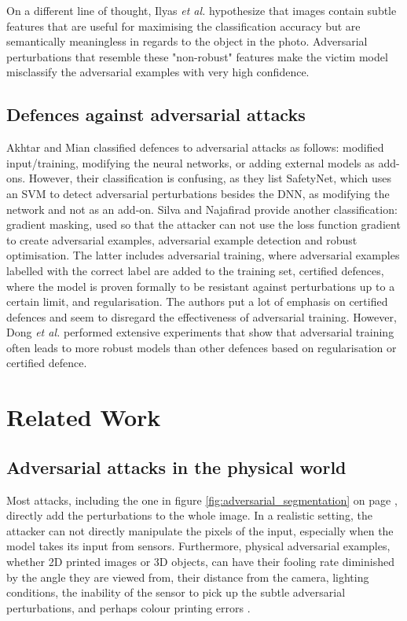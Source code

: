On a different line of thought, Ilyas \textit{et al.} \cite{adv_examples_bugs} hypothesize that images contain subtle features that are useful for maximising the classification accuracy but are semantically meaningless in regards to the object in the photo. Adversarial perturbations that resemble these "non-robust" features make the victim model misclassify the adversarial examples with very high confidence.

\subsection{Defences against adversarial attacks}

Akhtar and Mian \cite{akhtar} classified defences to adversarial attacks as follows: modified input/training, modifying the neural networks, or adding external models as add-ons. However, their classification is confusing, as they list SafetyNet, which uses an SVM to detect adversarial perturbations besides the DNN, as modifying the network and not as an add-on. Silva and Najafirad \cite{silva_survey} provide another classification: gradient masking, used so that the attacker can not use the loss function gradient to create adversarial examples, adversarial example detection and robust optimisation. The latter includes adversarial training, where adversarial examples labelled with the correct label are added to the training set, certified defences, where the model is proven formally to be resistant against perturbations up to a certain limit, and regularisation. The authors put a lot of emphasis on certified defences and seem to disregard the effectiveness of adversarial training. However, Dong \textit{et al.} \cite{dong2020benchmarking} performed extensive experiments that show that adversarial training often leads to more robust models than other defences based on regularisation or certified defence.

\section{Related Work}
\subsection{Adversarial attacks in the physical world}
    \label{subsec:physical_attacks_challenges}

Most attacks, including the one in figure \ref{fig:adversarial_segmentation} on page \pageref{fig:adversarial_segmentation}, directly add the perturbations to the whole image. In a realistic setting, the attacker can not directly manipulate the pixels of the input, especially when the model takes its input from sensors. Furthermore, physical adversarial examples, whether 2D printed images or 3D objects, can have their fooling rate diminished by the angle they are viewed from, their distance from the camera, lighting conditions, the inability of the sensor to pick up the subtle adversarial perturbations, and perhaps colour printing errors \cite{kurakin2016adversarial, athalye, evtimov_road_signs}.

